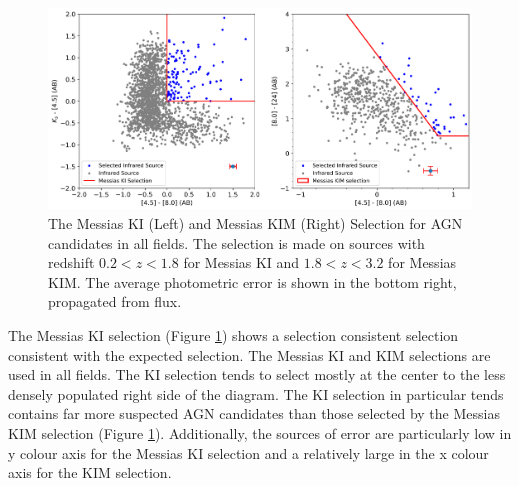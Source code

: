 \documentclass[11pt]{iopart}
\begin{document}
\begin{figure}
  \centering
  \includegraphics[width=0.9\linewidth]{plots/All_fieldsMessiasKIKIMSelection_error.png}
  \caption{The Messias KI (Left) and Messias KIM (Right) Selection for AGN candidates in all fields. The selection is made on sources with redshift $0.2 < z < 1.8$ for Messias KI and $1.8 < z < 3.2$ for Messias KIM. The average photometric error is shown in the bottom right, propagated from flux.}
  \label{fig:MessiasKIKIM}
\end{figure}
\newpage
The Messias KI selection (Figure \ref{fig:MessiasKIKIM}) shows a selection consistent selection consistent with the expected selection. The Messias KI and KIM selections are used in all fields. The KI selection tends to select mostly at the center to the less densely populated right side of the diagram. The KI selection in particular tends contains far more suspected AGN candidates than those selected by the Messias KIM selection (Figure \ref{fig:MessiasKIKIM}). Additionally, the sources of error are particularly low in y colour axis for the Messias KI selection and a relatively large in the x colour axis for the KIM selection. 
\end{document}
